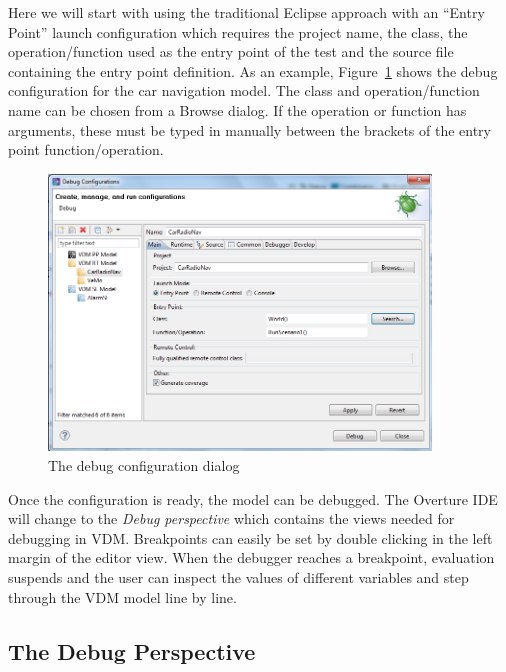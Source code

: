 Here we will start with using 
the traditional Eclipse approach with an ``Entry Point'' launch
configuration which 
requires the project name, the class, the operation/function used as
the entry point of the test and the source file containing the entry
point definition.  As an example,
Figure~\ref{fig:userguide:debugConfiguration} shows the debug
configuration for the car navigation model. The class and
operation/function name can be chosen from a Browse dialog. If the
operation or function has arguments, these must be typed in manually
between the brackets of the entry point function/operation.

\begin{figure}[htp]
\begin{center}
  \includegraphics[width=4in]{figures/DebugConfigurationRT}
  \caption{The debug configuration dialog}
  \label{fig:userguide:debugConfiguration}
\end{center}
\end{figure}

Once the configuration is ready, the model can be debugged. The
Overture IDE will change to the \emph{Debug perspective} which
contains the views needed for debugging in VDM. Breakpoints can easily
be set by double clicking in the left margin of the editor view. When
the debugger reaches a breakpoint, evaluation suspends and the user
can inspect the values of different variables and step through the VDM
model line by line.
 
\subsection{The Debug Perspective}

